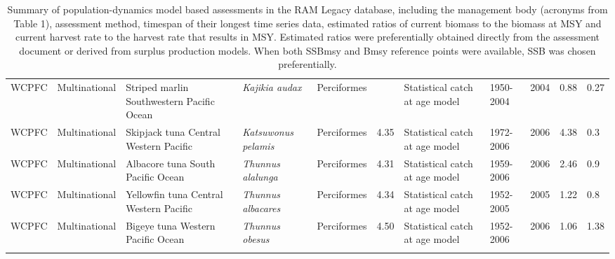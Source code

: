 \begin{longtable}{p{1.5cm}p{1.5cm}p{3cm}p{3cm}p{2.5cm}p{0.9cm}p{1.4cm}p{0.9cm}p{0.9cm}p{0.9cm}p{1cm}}
  WCPFC & Multinational & Striped marlin Southwestern Pacific Ocean & \textit{Kajikia audax} & Perciformes &  & Statistical catch at age model & 1950-2004 & 2004 & 0.88 & 0.27 \\ 
  WCPFC & Multinational & Skipjack tuna Central Western Pacific & \textit{Katsuwonus pelamis} & Perciformes & 4.35 & Statistical catch at age model & 1972-2006 & 2006 & 4.38 & 0.3 \\ 
  WCPFC & Multinational & Albacore tuna South Pacific Ocean & \textit{Thunnus alalunga} & Perciformes & 4.31 & Statistical catch at age model & 1959-2006 & 2006 & 2.46 & 0.9 \\ 
  WCPFC & Multinational & Yellowfin tuna Central Western Pacific & \textit{Thunnus albacares} & Perciformes & 4.34 & Statistical catch at age model & 1952-2005 & 2005 & 1.22 & 0.8 \\ 
  WCPFC & Multinational & Bigeye tuna Western Pacific Ocean & \textit{Thunnus obesus} & Perciformes & 4.50 & Statistical catch at age model & 1952-2006 & 2006 & 1.06 & 1.38 \\ 
   \hline
\hline
\caption{Summary of population-dynamics model based assessments in the RAM Legacy database, including the management body (acronyms from Table 1), assessment method, timespan of their longest time series data, estimated ratios of current biomass to the biomass at MSY and current harvest rate to the harvest rate that results in MSY. Estimated ratios were preferentially obtained directly from the assessment document or derived from surplus production models. When both SSBmsy and Bmsy reference points were available, SSB was chosen preferentially.}
\label{tab:crosshair}
\end{longtable}
